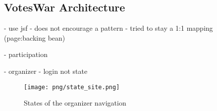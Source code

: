 %
%
%
%
% 
%

\subsection{VotesWar Architecture}

- use jsf 
- does not encourage a pattern
- tried to stay a 1:1 mapping (page:backing bean)


- participation

- organizer
	- login not state

\begin{figure}[h]
\centering
\texttt{[image: png/state\_site.png]}
\caption{States of the organizer navigation}
\label{figure:state_site}
\end{figure}


